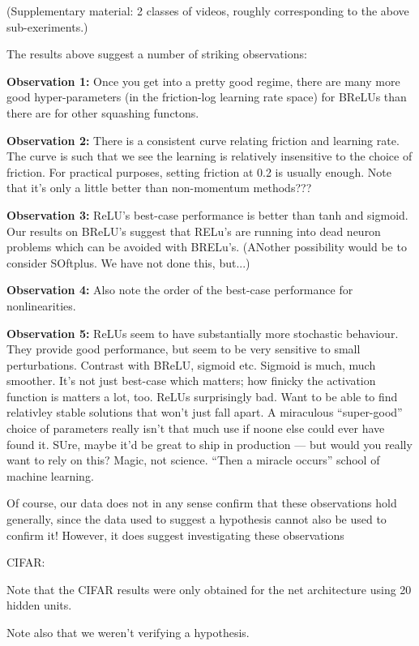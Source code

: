 \documentclass[10pt]{article}
\begin{document}
(Supplementary material: 2 classes of videos, roughly corresponding to
the above sub-exeriments.)

The results above suggest a number of striking observations:

\textbf{Observation 1:} Once you get into a pretty good regime, there
are many more good hyper-parameters (in the friction-log learning rate
space) for BReLUs than there are for other squashing functons.

\textbf{Observation 2:} There is a consistent curve relating friction
and learning rate.  The curve is such that we see the learning is
relatively insensitive to the choice of friction.  For practical
purposes, setting friction at 0.2 is usually enough.  Note that it's
only a little better than non-momentum methods???

\textbf{Observation 3:} ReLU's best-case performance is better than
tanh and sigmoid.  Our results on BReLU's suggest that RELu's are
running into dead neuron problems which can be avoided with BRELu's.
(ANother possibility would be to consider SOftplus.  We have not done
this, but...)

\textbf{Observation 4:} Also note the order of the best-case
performance for nonlinearities.

\textbf{Observation 5:} ReLUs seem to have substantially more
stochastic behaviour.  They provide good performance, but seem to be
very sensitive to small perturbations. Contrast with BReLU, sigmoid
etc.  Sigmoid is much, much smoother.  It's not just best-case which
matters; how finicky the activation function is matters a lot, too.
ReLUs surprisingly bad.  Want to be able to find relativley stable
solutions that won't just fall apart.  A miraculous ``super-good''
choice of parameters really isn't that much use if noone else could
ever have found it. SUre, maybe it'd be great to ship in production
--- but would you really want to rely on this?  Magic, not science.
``Then a miracle occurs'' school of machine learning.

Of course, our data does not in any sense confirm that these
observations hold generally, since the data used to suggest a
hypothesis cannot also be used to confirm it!  However, it does
suggest investigating these observations



CIFAR:

Note that the CIFAR results were only obtained for the net
architecture using 20 hidden units.

Note also that we weren't verifying a hypothesis.
\end{document}
